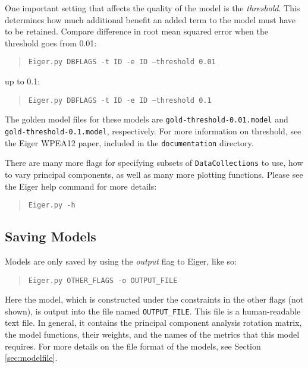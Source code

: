 One important setting that affects the quality of the model is the {\em threshold}. This determines how much additional benefit an added term to the model must have to be retained. Compare difference in root mean squared error when the threshold goes from 0.01:
	\begin{quote}
	\texttt{Eiger.py DBFLAGS -t ID -e ID --threshold 0.01}
	\end{quote}
up to 0.1:
	\begin{quote}
	\texttt{Eiger.py DBFLAGS -t ID -e ID --threshold 0.1}
	\end{quote}
The golden model files for these models are \texttt{gold-threshold-0.01.model} and \texttt{gold-threshold-0.1.model}, respectively. For more information on threshold, see the Eiger WPEA12 paper, included in the \texttt{documentation} directory.

There are many more flags for specifying subsets of \texttt{DataCollections} to use, how to vary principal components, as well as many more plotting functions. Please see the Eiger help command for more details:
	\begin{quote}
	\texttt{Eiger.py -h}
	\end{quote}

\subsection{Saving Models}
Models are only saved by using the {\em output} flag to Eiger, like so:
	\begin{quote}
	\texttt{Eiger.py OTHER\_FLAGS -o OUTPUT\_FILE}
	\end{quote}
Here the model, which is constructed under the constraints in the other flags (not shown), is output into the file named \texttt{OUTPUT\_FILE}. This file is a human-readable text file. In general, it contains the principal component analysis rotation matrix, the model functions, their weights, and the names of the metrics that this model requires. For more details on the file format of the models, see Section \ref{sec:modelfile}.

